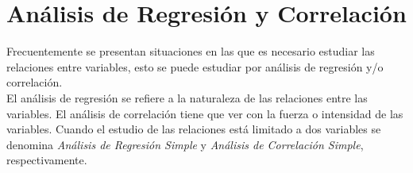 \chapter{Análisis de Regresión y Correlación}
Frecuentemente se presentan situaciones en las que es necesario estudiar las relaciones entre variables, esto se puede estudiar por análisis de regresión y/o correlación.
\\$ { } $\\
El análisis de regresión se refiere a la naturaleza de las relaciones entre las variables. El análisis de correlación tiene que ver con la fuerza o intensidad de las variables. Cuando el estudio de las relaciones está limitado a dos variables se denomina \textit{Análisis de Regresión Simple} y \textit{Análisis de Correlación Simple}, respectivamente.











